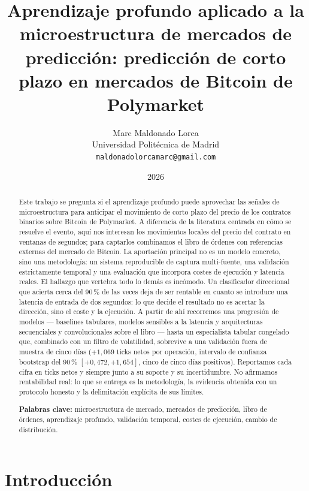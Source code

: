 \documentclass[11pt,a4paper]{article}
\title{\textbf{Aprendizaje profundo aplicado a la microestructura de mercados de
predicción: predicción de corto plazo en mercados de Bitcoin de Polymarket}}
\author{Marc Maldonado Lorca\\
\small Universidad Politécnica de Madrid\\
\small \texttt{maldonadolorcamarc@gmail.com}}
\date{2026}
\begin{document}
\maketitle

\begin{abstract}
\noindent
Este trabajo se pregunta si el aprendizaje profundo puede aprovechar las señales
de microestructura para anticipar el movimiento de corto plazo del precio de los
contratos binarios sobre Bitcoin de Polymarket. A diferencia de la literatura
centrada en cómo se resuelve el evento, aquí nos interesan los movimientos locales
del precio del contrato en ventanas de segundos; para captarlos combinamos el
libro de órdenes con referencias externas del mercado de Bitcoin. La aportación
principal no es un modelo concreto, sino una metodología: un sistema reproducible
de captura multi-fuente, una validación estrictamente temporal y una evaluación
que incorpora costes de ejecución y latencia reales. El hallazgo que vertebra todo
lo demás es incómodo. Un clasificador direccional que acierta cerca del 90\,\% de
las veces deja de ser rentable en cuanto se introduce una latencia de entrada de
dos segundos: lo que decide el resultado no es acertar la dirección, sino el coste
y la ejecución. A partir de ahí recorremos una progresión de modelos --- baselines
tabulares, modelos sensibles a la latencia y arquitecturas secuenciales y
convolucionales sobre el libro --- hasta un especialista tabular congelado que,
combinado con un filtro de volatilidad, sobrevive a una validación fuera de
muestra de cinco días ($+1{,}069$ ticks netos por operación, intervalo de
confianza bootstrap del 90\,\% $[+0{,}472, +1{,}654]$, cinco de cinco días
positivos). Reportamos cada cifra en ticks netos y siempre junto a su soporte y su
incertidumbre. No afirmamos rentabilidad real: lo que se entrega es la
metodología, la evidencia obtenida con un protocolo honesto y la delimitación
explícita de sus límites.

\vspace{0.5em}
\noindent\textbf{Palabras clave:} microestructura de mercado, mercados de
predicción, libro de órdenes, aprendizaje profundo, validación temporal, costes
de ejecución, cambio de distribución.
\end{abstract}

\section{Introducción}
\end{document}
